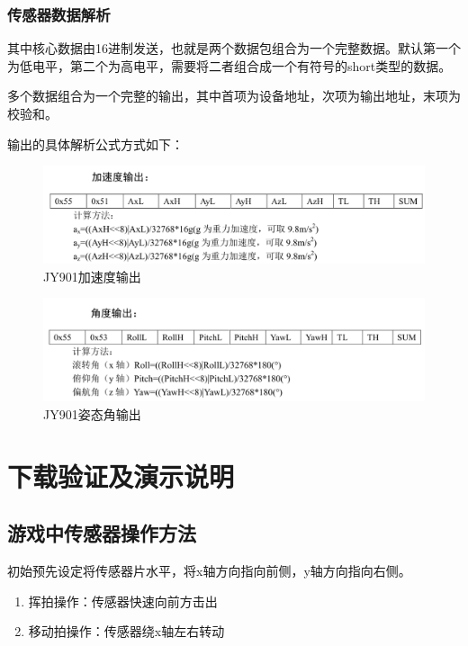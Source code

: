 \documentclass[UTF8]{article}
\begin{document}
\subsubsection{传感器数据解析}
其中核心数据由16进制发送，也就是两个数据包组合为一个完整数据。默认第一个为低电平，第二个为高电平，需要将二者组合成一个有符号的short类型的数据。\par
多个数据组合为一个完整的输出，其中首项为设备地址，次项为输出地址，末项为校验和。\par
输出的具体解析公式方式如下：
	\begin{figure}[H]
		\centering
		\includegraphics[width=\linewidth]{2-2.png}
			\caption{JY901加速度输出}	
	\end{figure}
	\begin{figure}[H]
		\centering
		\includegraphics[width=\linewidth]{2-3.png}
			\caption{JY901姿态角输出}	
	\end{figure}
\section{下载验证及演示说明}
\subsection{游戏中传感器操作方法}
初始预先设定将传感器片水平，将x轴方向指向前侧，y轴方向指向右侧。
\begin{enumerate}
\item 挥拍操作：传感器快速向前方击出
\item 移动拍操作：传感器绕x轴左右转动
\end{enumerate}
\end{document}
